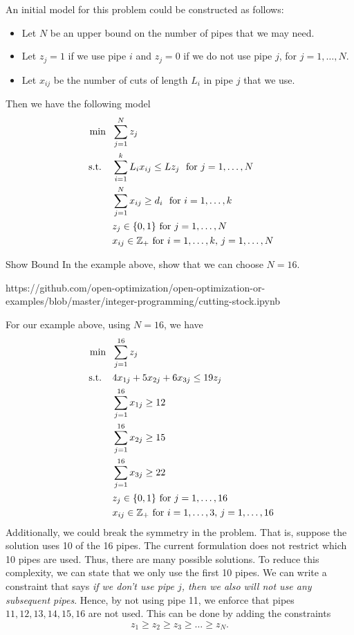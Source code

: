 An initial model for this problem could be constructed as follows:  
\begin{itemize}
\item Let $N$ be an upper bound on the number of pipes that we may need.
\item Let $z_j = 1$ if we use pipe $i$ and $z_j = 0$ if we do not use pipe $j$, for $j=1, \dots, N$.
\item Let $x_{ij}$ be the number of cuts of length $L_i$ in pipe $j$ that we use.
\end{itemize}
Then we have the following model
\begin{equation}
\begin{split}
\min\ \  & \sum_{j=1}^N z_j\\
\mbox{ s.t. } \ \  & \sum_{i=1}^k  L_i x_{ij} \leq Lz_j \ \mbox{ for } j=1,\dots, N\\
& \sum_{j=1}^N x_{ij} \geq d_i \ \mbox{ for } i=1, \dots, k\\
& z_j \in \{0,1\} \mbox{ for } j=1, \dots, N\\
& x_{ij} \in {\mathbb{Z}}_+ \mbox{ for } i=1, \dots, k,\, j=1, \dots, N
\end{split}
\end{equation}
\begin{exercise}{Show Bound}{}
In the example above, show that we can choose $N=16$.
\end{exercise}
\begin{examplewithcode}{}{https://github.com/open-optimization/open-optimization-or-examples/blob/master/integer-programming/cutting-stock.ipynb}{}{}

For our example above, using $N=16$, we have
\begin{equation}
\begin{split}
\min\ \  & \sum_{j=1}^{16} z_j\\
\mbox{ s.t. } \ \  &  4 x_{1j} + 5 x_{2j} + 6 x_{3j} \leq 19 z_j\\
& \sum_{j=1}^{16} x_{1j} \geq 12\\
& \sum_{j=1}^{16} x_{2j} \geq 15\\
& \sum_{j=1}^{16} x_{3j} \geq 22\\
& z_j \in \{0,1\} \mbox{ for } j=1, \dots, 16\\
& x_{ij} \in {\mathbb{Z}}_+ \mbox{ for } i=1, \dots, 3,\, j=1, \dots, 16
\end{split}
\end{equation}
Additionally, we could break the symmetry in the problem.  That is, suppose the solution uses 10 of the 16 pipes.  The current formulation does not restrict which 10 pipes are used.  Thus, there are many possible solutions.  To reduce this complexity, we can state that we only use the first 10 pipes.  We can write a constraint that says \emph{if we don't use pipe $j$, then we also will not use any subsequent pipes}.  Hence, by not using pipe 11, we enforce that pipes $11, 12, 13, 14,15,16$ are not used.  This can be done by adding the constraints
\begin{equation}
z_1 \geq z_2 \geq z_3 \geq \dots \geq z_N.
\end{equation}

\end{examplewithcode}

